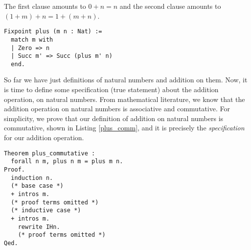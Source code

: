 \documentclass[conference,compsoc]{IEEEtran}
\begin{document}
\noindent 
The first clause amounts to $0 + n = n$ and the second clause
amounts to $ (1 + m) + n = 1 + (m + n)$.


\begin{lstlisting}[frame=single, language=Coq, caption={Addition of two Natural Numbers},
  label={add_fn},captionpos=t, basicstyle=\ttfamily\footnotesize,
  abovecaptionskip=-\medskipamount]
Fixpoint plus (m n : Nat) :=
  match m with
  | Zero => n
  | Succ m' => Succ (plus m' n)
  end.

\end{lstlisting}


So far we have just definitions of natural numbers and addition on them.
Now, it is time to define some specification (true statement) about
the addition operation, on natural numbers. From mathematical 
literature, we know that the addition operation on natural
numbers is associative and commutative. For simplicity, we
prove that our definition of addition on natural numbers is commutative, shown in 
Listing \ref{plus_comm}, and it is precisely the \emph{specification} for 
our addition operation. 

\begin{lstlisting}[frame=single, language=Coq, caption={Addition is Commutative},
  label={plus_comm},captionpos=t, basicstyle=\ttfamily\footnotesize,
  abovecaptionskip=-\medskipamount]
Theorem plus_commutative : 
  forall n m, plus n m = plus m n. 
Proof.
  induction n.
  (* base case *)
  + intros m.
  (* proof terms omitted *)
  (* inductive case *)  
  + intros m.
    rewrite IHn.
    (* proof terms omitted *)
Qed.
  
\end{lstlisting}
\end{document}
